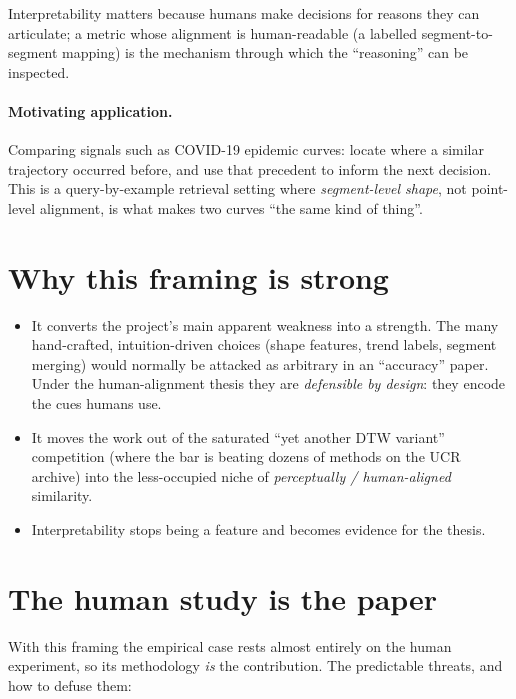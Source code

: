 \documentclass[11pt]{article}
\begin{document}
\noindent
Interpretability matters because humans make decisions for reasons they can articulate;
a metric whose alignment is human-readable (a labelled segment-to-segment mapping) is the
mechanism through which the ``reasoning'' can be inspected.

\paragraph{Motivating application.} Comparing signals such as COVID-19 epidemic curves:
locate where a similar trajectory occurred before, and use that precedent to inform the
next decision. This is a query-by-example retrieval setting where \emph{segment-level
shape}, not point-level alignment, is what makes two curves ``the same kind of thing''.

\section{Why this framing is strong}
\begin{itemize}[leftmargin=*]
  \item It converts the project's main apparent weakness into a strength. The many
  hand-crafted, intuition-driven choices (shape features, trend labels, segment merging)
  would normally be attacked as arbitrary in an ``accuracy'' paper. Under the
  human-alignment thesis they are \emph{defensible by design}: they encode the cues humans
  use.
  \item It moves the work out of the saturated ``yet another DTW variant'' competition
  (where the bar is beating dozens of methods on the UCR archive) into the
  less-occupied niche of \emph{perceptually / human-aligned} similarity.
  \item Interpretability stops being a feature and becomes evidence for the thesis.
\end{itemize}

\section{The human study is the paper}
With this framing the empirical case rests almost entirely on the human experiment, so
its methodology \emph{is} the contribution. The predictable threats, and how to defuse
them:
\end{document}
